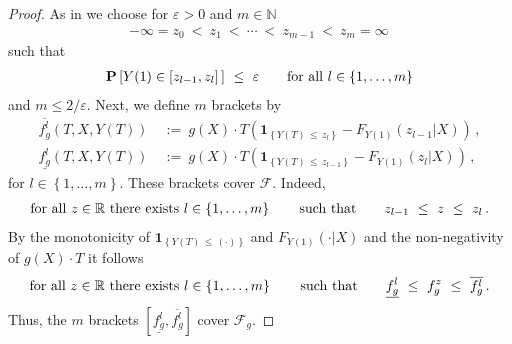 \begin{proof}
  As in \cite[Example~19.6]{Vaart2000}
  we choose for
  $\varepsilon>0$ and $m\in\mathbb{N}$
  \begin{gather*}
  -\infty=z_0\ <\ z_1\ <\ \cdots\ <\ z_{m-1}\ <\ z_m=\infty
  \,
  \end{gather*}
  such that
  \begin{gather}
    \label{size_z}
    \P
    \left[ 
      Y(1)\in \left[ z_{l-1},z_l \right]\,
    \right]
    \ 
    \le
    \ 
    \varepsilon
    \qquad
    \text{for all}\ 
    l\in \left\{ 1,\ldots,m \right\}
  \end{gather}
  and $m \le 2/\varepsilon$.
  Next, we define $m$ brackets by
\begin{align*}
  \overline{f_g^l}
  (T,X,Y(T))
  &
  \ 
  :=
  \ 
      g(X)
      \cdot
      T
      \left( 
        \mathbf{1}
        _{\left\{  Y(T)\,\le\,z_{l} \right\}}
        -
        F_{Y(1)}(z_{l-1}|X)
      \right)
      \,,
      \\
  \underline{f_g^l}
  (T,X,Y(T))
  &
  \ 
  :=
  \ 
      g(X)
      \cdot
      T
      \left( 
        \mathbf{1}
        _{\left\{  Y(T)\,\le\,z_{l-1} \right\}}
        -
        F_{Y(1)}(z_l|X)
      \right)
      \,,
\end{align*}
for $l\in \left\{ 1,\ldots,m \right\}$.
These brackets cover $\mathcal{F}$.
Indeed,
\begin{gather*}
  \text{for all}\ 
  z\in\R
  \ 
  \text{there exists} \ 
l\in \left\{ 1,\ldots,m \right\}
\qquad 
\text{such that}\qquad
z_{l-1}
\ 
\le
\ 
z
\ 
\le
\ 
z_l
\,.
\end{gather*}
By the monotonicity of 
$
        \mathbf{1}
      _{\left\{  Y(T)\,\le\,(\cdot) \right\}}
$
and
$
        F_{Y(1)}(\cdot|X)
$
and the non-negativity of $g(X)\cdot T$ it follows
\begin{gather*}
  \text{for all}\ 
  z\in\R
  \ 
  \text{there exists} \ 
l\in \left\{ 1,\ldots,m \right\}
\qquad 
\text{such that}\qquad
  \underline{f_g^l}
  \ 
  \le
  \ 
  f_g^z
  \ 
  \le
  \ 
  \overline{f_g^l}
  \,.
\end{gather*}
Thus, the $m$ brackets 
$
[
  \underline{f_g^l}
  ,
  \overline{f_g^l}
]
$
cover $\mathcal{F}_g$.


\end{proof}
